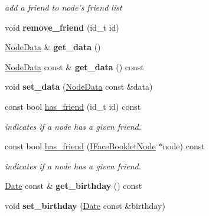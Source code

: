 \begin{DoxyCompactItemize}
\begin{DoxyCompactList}\small\item\em add a friend to node's friend list \end{DoxyCompactList}\item 
\hypertarget{classfb_1_1_profile_a45472768709c2eb8665ce6e50e2fb5ce}{void {\bfseries remove\+\_\+friend} (id\+\_\+t id)}\label{classfb_1_1_profile_a45472768709c2eb8665ce6e50e2fb5ce}

\item 
\hypertarget{classfb_1_1_profile_a6a579e8b0adade2c3cd499882cf473fc}{\hyperlink{classfb_1_1_node_data}{Node\+Data} \& {\bfseries get\+\_\+data} ()}\label{classfb_1_1_profile_a6a579e8b0adade2c3cd499882cf473fc}

\item 
\hypertarget{classfb_1_1_profile_abc344e9cdafc14dafdaa74678a3cfa48}{\hyperlink{classfb_1_1_node_data}{Node\+Data} const \& {\bfseries get\+\_\+data} () const }\label{classfb_1_1_profile_abc344e9cdafc14dafdaa74678a3cfa48}

\item 
\hypertarget{classfb_1_1_profile_a278304ec0bd7b0f079292069da3cf46f}{void {\bfseries set\+\_\+data} (\hyperlink{classfb_1_1_node_data}{Node\+Data} const \&data)}\label{classfb_1_1_profile_a278304ec0bd7b0f079292069da3cf46f}

\item 
const bool \hyperlink{classfb_1_1_profile_a5f74385d661e8923dd5e66faf35247d7}{has\+\_\+friend} (id\+\_\+t id) const 
\begin{DoxyCompactList}\small\item\em indicates if a node has a given friend. \end{DoxyCompactList}\item 
const bool \hyperlink{classfb_1_1_profile_abe318da2aba42f412dc7373057aa983b}{has\+\_\+friend} (\hyperlink{structfb_1_1_i_face_booklet_node}{I\+Face\+Booklet\+Node} $\ast$node) const 
\begin{DoxyCompactList}\small\item\em indicates if a node has a given friend. \end{DoxyCompactList}\item 
\hypertarget{classfb_1_1_profile_a486c8d589a51ca28dcef95d05aa04dce}{\hyperlink{structfb_1_1_date}{Date} const \& {\bfseries get\+\_\+birthday} () const }\label{classfb_1_1_profile_a486c8d589a51ca28dcef95d05aa04dce}

\item 
\hypertarget{classfb_1_1_profile_a9f2b34badc4cce972e6d47e5a9be508b}{void {\bfseries set\+\_\+birthday} (\hyperlink{structfb_1_1_date}{Date} const \&birthday)}\label{classfb_1_1_profile_a9f2b34badc4cce972e6d47e5a9be508b}


\end{DoxyCompactItemize}
